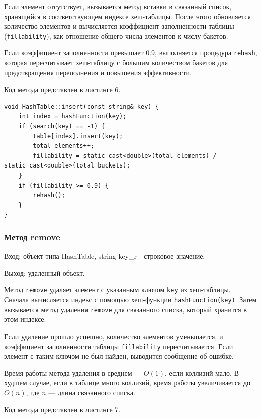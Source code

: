 \documentclass[11pt,a4paper,final]{article} %
\begin{document}
\par Если элемент отсутствует, вызывается метод вставки в связанный список, хранящийся в соответствующем индексе хеш-таблицы. После этого обновляется количество элементов и вычисляется коэффициент заполненности таблицы (\texttt{fillability}), как отношение общего числа элементов к числу бакетов.

\par Если коэффициент заполненности превышает 0.9, выполняется процедура \texttt{rehash}, которая пересчитывает хеш-таблицу с большим количеством бакетов для предотвращения переполнения и повышения эффективности.


Код метода представлен в листинге 6.
\begin{lstlisting}[label=add, caption = Метод insert]
void HashTable::insert(const string& key) {
	int index = hashFunction(key);
	if (search(key) == -1) {
		table[index].insert(key);
		total_elements++;
		fillability = static_cast<double>(total_elements) / static_cast<double>(total_buckets);
	}
	if (fillability >= 0.9) {
		rehash();
	}
}
\end{lstlisting}

\subsubsection{Метод remove}
Вход: объект типа HashTable, string key\_r - строковое значение. \par
Выход: удаленный объект. \par

\par Метод \texttt{remove} удаляет элемент с указанным ключом \texttt{key} из хеш-таблицы. Сначала вычисляется индекс с помощью хеш-функции \texttt{hashFunction(key)}. Затем вызывается метод удаления \texttt{remove} для связанного списка, который хранится в этом индексе.

\par Если удаление прошло успешно, количество элементов уменьшается, и коэффициент заполненности таблицы \texttt{fillability} пересчитывается. Если элемент с таким ключом не был найден, выводится сообщение об ошибке.

\par Время работы метода удаления в среднем — $O(1)$, если коллизий мало. В худшем случае, если в таблице много коллизий, время работы увеличивается до $O(n)$, где $n$ — длина связанного списка.

Код метода представлен в листинге 7.
\end{document}

